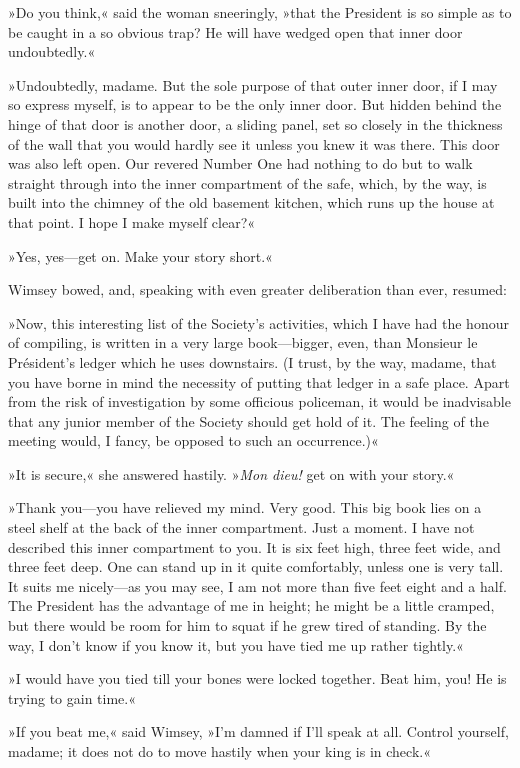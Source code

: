»Do you think,« said the woman sneeringly, »that the President is so simple as to be caught in a so obvious trap? He will have wedged open that inner door undoubtedly.«

»Undoubtedly, madame. But the sole purpose of that outer inner door, if I may so express myself, is to appear to be the only inner door. But hidden behind the hinge of that door is another door, a sliding panel, set so closely in the thickness of the wall that you would hardly see it unless you knew it was there. This door was also left open. Our revered Number One had nothing to do but to walk straight through into the inner compartment of the safe, which, by the way, is built into the chimney of the old basement kitchen, which runs up the house at that point. I hope I make myself clear?«

»Yes, yes—get on. Make your story short.«

Wimsey bowed, and, speaking with even greater deliberation than ever, resumed:

»Now, this interesting list of the Society's activities, which I have had the honour of compiling, is written in a very large book—bigger, even, than Monsieur le Président's ledger which he uses downstairs. (I trust, by the way, madame, that you have borne in mind the necessity of putting that ledger in a safe place. Apart from the risk of investigation by some officious policeman, it would be inadvisable that any junior member of the Society should get hold of it. The feeling of the meeting would, I fancy, be opposed to such an occurrence.)«

»It is secure,« she answered hastily. »\textit{Mon dieu!} get on with your story.«

»Thank you—you have relieved my mind. Very good. This big book lies on a steel shelf at the back of the inner compartment. Just a moment. I have not described this inner compartment to you. It is six feet high, three feet wide, and three feet deep. One can stand up in it quite comfortably, unless one is very tall. It suits me nicely—as you may see, I am not more than five feet eight and a half. The President has the advantage of me in height; he might be a little cramped, but there would be room for him to squat if he grew tired of standing. By the way, I don't know if you know it, but you have tied me up rather tightly.«

»I would have you tied till your bones were locked together. Beat him, you! He is trying to gain time.«

»If you beat me,« said Wimsey, »I'm damned if I'll speak at all. Control yourself, madame; it does not do to move hastily when your king is in check.«

